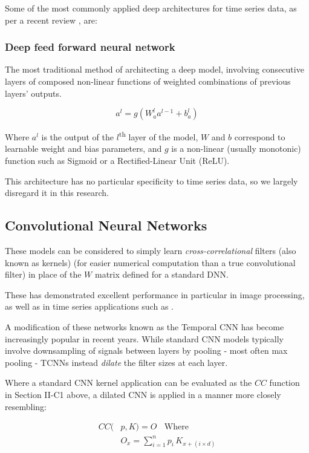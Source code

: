 \documentclass[9pt,conference]{IEEEtran}
\begin{document}
Some of the most commonly applied deep architectures for time series data, as per a recent review \cite{dlTSReview}, are:
\subsubsection{Deep feed forward neural network}
The most traditional method of architecting a deep model, involving consecutive layers of composed non-linear functions of weighted combinations of previous layers' outputs. 

\begin{equation*}
    a^l = g\left(W_a^la^{l-1}+b_a^l\right)
\end{equation*}

Where $a^l$ is the output of the $l$\textsuperscript{th} layer of the model, $W$ and $b$ correspond to learnable weight and bias parameters, and $g$ is a non-linear (usually monotonic) function such as Sigmoid or a Rectified-Linear Unit (ReLU).

This architecture has no particular specificity to time series data, so we largely disregard it in this research.

\subsection{Convolutional Neural Networks}
These models can be considered to simply learn \textit{cross-correlational} filters (also known as kernels) (for easier numerical computation than a true convolutional filter) in place of the $W$ matrix defined for a standard DNN.

These has demonstrated excellent performance in particular in image processing, as well as in time series applications such as \cite{stanfordML}.

A modification of these networks known as the Temporal CNN has become increasingly popular in recent years. While standard CNN models typically involve downsampling of signals between layers by pooling - most often max pooling - TCNNs instead \textit{dilate} the filter sizes at each layer.

Where a standard CNN kernel application can be evaluated as the $CC$ function in Section II-C1 above, a dilated CNN is applied in a manner more closely resembling:

\begin{align*}
            CC(&p,K) = O \;\;\text{ Where}\\
            &O_x = \sum_{i=1}^{n}p_i\, K_{x+\left(i\times d\right)} \\
\end{align*}
\end{document}
